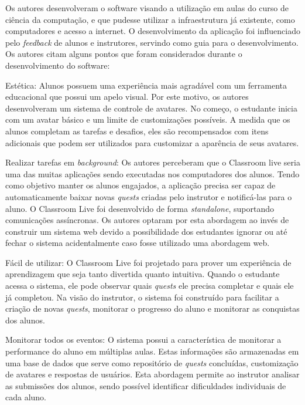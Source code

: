\documentclass[
	12pt,				%
	oneside,			%
	a4paper,			%
	english,			%
	french,				%
	spanish,			%
	brazil,				%
	]{abntex2}
\begin{document}
Os autores desenvolveram o software visando a utilização em aulas do curso de ciência da computação, e que pudesse utilizar a infraestrutura já existente, como computadores e acesso a internet. O desenvolvimento da aplicação foi influenciado pelo \textit{feedback} de alunos e instrutores, servindo como guia para o desenvolvimento. Os autores citam alguns pontos que foram considerados durante o desenvolvimento do software:

Estética: Alunos possuem uma experiência mais agradável com um ferramenta educacional que possui um apelo visual. Por este motivo, os autores desenvolveram um sistema de controle de avatares. No começo, o estudante inicia com um avatar básico e um limite de customizações possíveis. A medida que os alunos completam as tarefas e desafios, eles são recompensados com itens adicionais que podem ser utilizados para customizar a aparência de seus avatares.

Realizar tarefas em \textit{background}: Os autores perceberam que o Classroom live seria uma das muitas aplicações sendo executadas nos computadores dos alunos. Tendo como objetivo manter os alunos engajados, a aplicação precisa ser capaz de automaticamente baixar novas \textit{quests} criadas pelo instrutor e notificá-las para o aluno. O Classroom Live foi desenvolvido de forma \textit{standalone}, suportando comunicações assíncronas. Os autores optaram por esta abordagem ao invés de construir um sistema web devido a possibilidade dos estudantes ignorar ou até fechar o sistema acidentalmente caso fosse utilizado uma abordagem web.

Fácil de utilizar: O Classroom Live foi projetado para prover um experiência de aprendizagem que seja tanto divertida quanto intuitiva. Quando o estudante acessa o sistema, ele pode observar quais \textit{quests} ele precisa completar e quais ele já completou. Na visão do instrutor, o sistema foi construído para facilitar a criação de novas \textit{quests}, monitorar o progresso do aluno e monitorar as conquistas dos alunos.

Monitorar todos os eventos: O sistema possui a característica de monitorar a performance do aluno em múltiplas aulas. Estas informações são armazenadas em uma base de dados que serve como repositório de \textit{quests} concluídas, customização de avatares e respostas de usuários. Esta abordagem permite ao instrutor analisar as submissões dos alunos, sendo possível identificar dificuldades individuais de cada aluno. 
\end{document}
